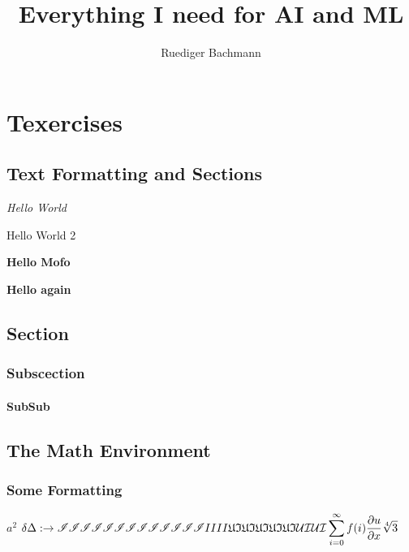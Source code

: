 \documentclass[8pt,oneside, german ,a4paper, fleqn, titlepage]{report}
\begin{document}
	
	\title{Everything I need for AI and ML}
	\author{Ruediger Bachmann} 
	\maketitle


\chapter{Texercises}

\section{Text Formatting and Sections}
{\em Hello World} 

Hello World 2

{\bf Hello Mofo}

{\Large \bf Hello again }

\section{Section}
\subsection{Subscection}
\subsubsection{SubSub}
	
\section{The Math Environment}

\subsection{Some Formatting}

$a^2$ \newline
\begin{math}
\delta \Delta : \rightarrow \newline
\mathscr{IIIIIIIIIIII}  \newline
\mathscr IIIII\newline
\mathfrak{UIUIUIUIUI}	\newline
\mathcal{U I U I } \newline
\displaystyle\sum_{i=0}^{\infty}
f(i)\frac{\partial u}{\partial x}
\sqrt[4]{3}
\end{math}  \newline
\end{document}
